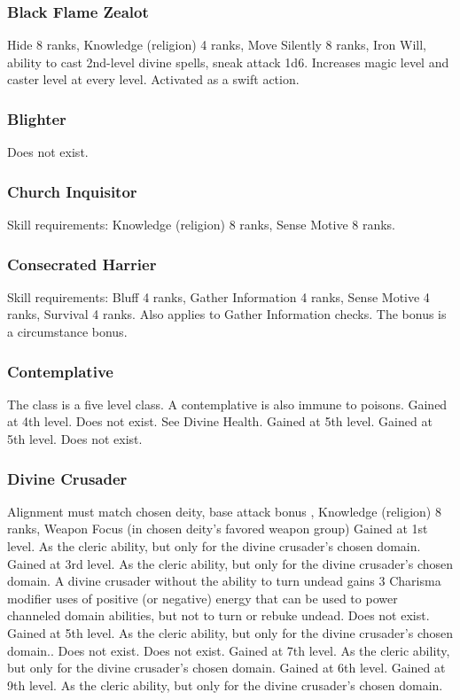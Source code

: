 \subsubsection{Black Flame Zealot}
 Hide 8 ranks, Knowledge (religion) 4 ranks, Move Silently 8 ranks, Iron Will, ability to cast 2nd-level divine spells, sneak attack \plus1d6.
 Increases magic level and caster level at every level.
 Activated as a swift action.
\subsubsection{Blighter}
Does not exist.
\subsubsection{Church Inquisitor}
 Skill requirements: Knowledge (religion) 8 ranks, Sense Motive 8 ranks.
\subsubsection{Consecrated Harrier}
 Skill requirements: Bluff 4 ranks, Gather Information 4 ranks, Sense Motive 4 ranks, Survival 4 ranks.
 Also applies to Gather Information checks. The bonus is a circumstance bonus.
\subsubsection{Contemplative}
 The class is a five level class.
 A contemplative is also immune to poisons.
 Gained at 4th level.
 Does not exist. See Divine Health.
 Gained at 5th level.
 Gained at 5th level.
 Does not exist.
\subsubsection{Divine Crusader}
 Alignment must match chosen deity, base attack bonus , Knowledge (religion) 8 ranks, Weapon Focus (in chosen deity's favored weapon group)
 Gained at 1st level. As the cleric ability, but only for the divine crusader's chosen domain.
 Gained at 3rd level. As the cleric ability, but only for the divine crusader's chosen domain. A divine crusader without the ability to turn undead gains 3 \add Charisma modifier uses of positive (or negative) energy that can be used to power channeled domain abilities, but not to turn or rebuke undead.
 Does not exist.
 Gained at 5th level. As the cleric ability, but only for the divine crusader's chosen domain..
 Does not exist.
 Does not exist.
 Gained at 7th level. As the cleric ability, but only for the divine crusader's chosen domain.
 Gained at 6th level.
 Gained at 9th level. As the cleric ability, but only for the divine crusader's chosen domain.
